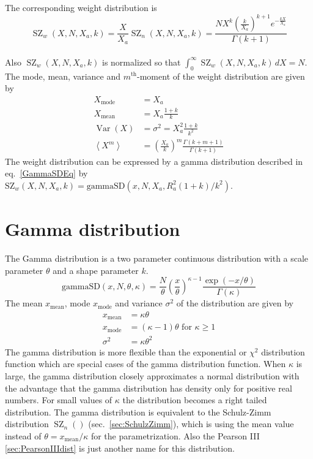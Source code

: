 The corresponding weight distribution is
\begin{equation}
\operatorname{SZ}_w(X,N,X_a,k) = \frac{X}{X_a}\operatorname{SZ}_n(X,N,X_a,k)
=  \frac{N X^k \left(\frac{k}{X_a}\right)^{k+1} e^{-\frac{kX}{X_a}}}{\Gamma(k+1)}
\end{equation}
~\\
Also $\operatorname{SZ}_w(X,N,X_a,k)$ is normalized so that $\int_0^\infty\!
\operatorname{SZ}_w(X,N,X_a,k)\,dX = N$.
The mode, mean, variance and
$m^\textrm{th}$-moment of the weight distribution are given by
\begin{subequations}
\begin{align}
X_\mathrm{mode} &= X_a\\
X_\mathrm{mean} &= X_a \frac{1+k}{k}\\
\operatorname{Var}\left(X\right)&=\sigma^2 = X_a^2\frac{1+k}{k^2} \\
\left\langle X^m \right\rangle &=
\left(\frac{X_a}{k}\right)^m  \frac{\Gamma \left(k+m+1\right)}{\Gamma \left(k+1\right)}
\label{eq:SZFstatparam}
\end{align}
\end{subequations}
The weight distribution can be expressed by a gamma distribution described in eq.\ \ref{GammaSDEq} by $\text{SZ}_w(X,N,X_a,k)=\text{gammaSD}(x,N,X_a,R_a^2(1+k)/k^2)$.


\clearpage
\section{Gamma distribution}
\label{sec:SZGammaDistr}

The Gamma distribution is a two parameter continuous distribution with
a scale parameter $\theta$ and a shape parameter $k$.
\begin{equation}
\text{gammaSD}(x,N,\theta,\kappa) =  \frac{N}{\theta}
\left(\frac{x}{\theta}\right)^{\kappa-1}
\frac{\exp(-x/\theta)}{\Gamma(\kappa)} \label{GammaSDEq}
\end{equation}
The mean $x_\text{mean}$, mode $x_\text{mode}$ and variance $\sigma^2$
of the distribution are given by
\begin{align}
x_\text{mean}   &= \kappa\theta \\
x_\text{mode}   &= (\kappa-1)\theta \text{ for } \kappa\geq 1 \\
\sigma^2        &= \kappa\theta^2
\end{align}
The gamma distribution is more flexible than the exponential or $\chi^2$ distribution
function which are special cases of the gamma distribution function.
When $\kappa$ is large, the gamma distribution closely approximates a normal distribution
with the advantage that the gamma distribution has density only for positive real
numbers. For small values of $\kappa$ the distribution becomes a right tailed distribution.
The gamma distribution is equivalent to the Schulz-Zimm distribution $\operatorname{SZ}_n()$ (sec.\ \ref{sec:SchulzZimm}), which is using the mean value instead of $\theta=x_\mathrm{mean}/\kappa$ for the parametrization. Also the Pearson III \ref{sec:PearsonIIIdist} is just another name for this distribution.

